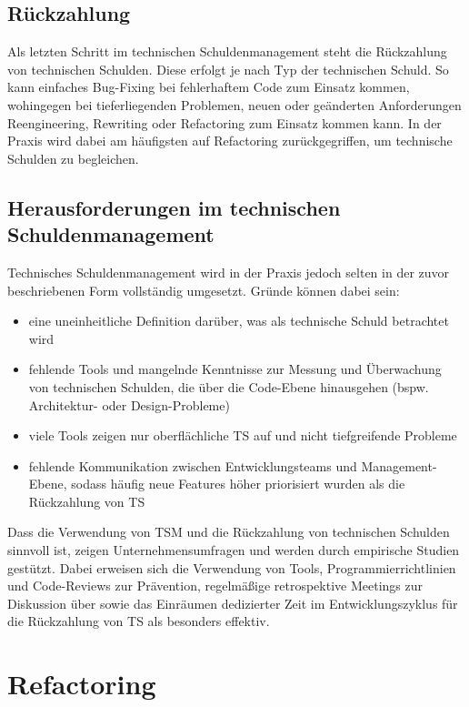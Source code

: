 \documentclass[acmtog]{acmart}
\begin{document}
\subsection{Rückzahlung}\label{sec:TSM_Rückzahlung}
Als letzten Schritt im technischen Schuldenmanagement steht die Rückzahlung von
technischen Schulden. Diese erfolgt je nach Typ der technischen Schuld. So kann
einfaches Bug-Fixing bei fehlerhaftem Code zum Einsatz kommen, wohingegen bei
tieferliegenden Problemen, neuen oder geänderten Anforderungen Reengineering,
Rewriting oder Refactoring zum Einsatz kommen kann. In der Praxis wird dabei
am häufigsten auf Refactoring zurückgegriffen, um technische Schulden zu
begleichen. \cite{Behutiye17, Holvitie18}

\subsection{Herausforderungen im technischen Schuldenmanagement}\label{sec:TSM_Herausforderungen}
Technisches Schuldenmanagement wird in der Praxis jedoch selten in der zuvor
beschriebenen Form vollständig umgesetzt. Gründe können dabei sein:
\begin{itemize}
  \item eine uneinheitliche Definition darüber, was als technische Schuld betrachtet wird
  \item fehlende Tools und mangelnde Kenntnisse zur Messung und Überwachung von
        technischen Schulden, die über die Code-Ebene hinausgehen (bspw. Architektur- oder Design-Probleme)
  \item viele Tools zeigen nur oberflächliche TS auf und nicht tiefgreifende Probleme
  \item fehlende Kommunikation zwischen Entwicklungsteams und Management-Ebene, sodass
        häufig neue Features höher priorisiert wurden als die Rückzahlung von TS
\end{itemize}

Dass die Verwendung von TSM und die Rückzahlung von technischen Schulden
sinnvoll ist, zeigen Unternehmensumfragen und werden durch empirische Studien
gestützt. \cite{Holvitie18, Griffith14} Dabei erweisen sich die Verwendung von
Tools, Programmierrichtlinien und Code-Reviews zur Prävention, regelmäßige
retrospektive Meetings zur Diskussion über sowie das Einräumen dedizierter Zeit
im Entwicklungszyklus für die Rückzahlung von TS als besonders effektiv. \cite{Alves16}


\section{Refactoring}\label{sec:Refactoring}
\end{document}
